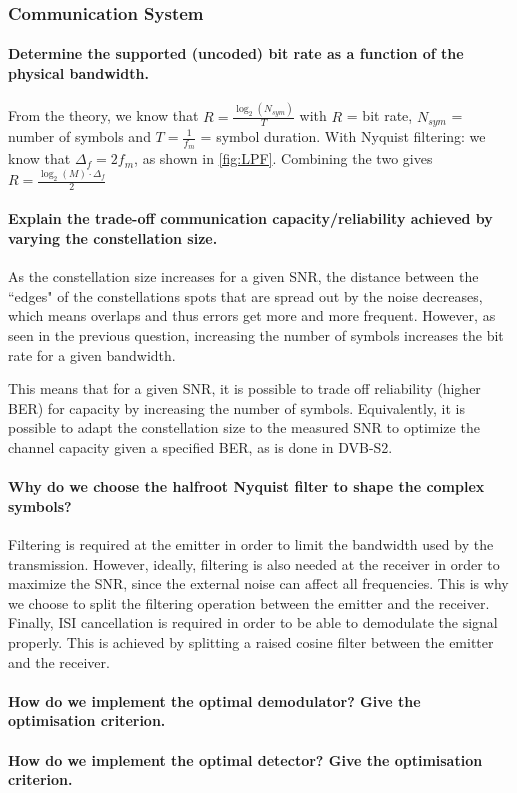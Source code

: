 \subsubsection{Communication System}
\paragraph{Determine the supported (uncoded) bit rate as a function of the physical bandwidth.} From the theory, we know that $R = \frac{\log_2(N_{sym})}{T}$ with $R$ = bit rate, $N_{sym}$ = number of symbols and $T = \frac{1}{f_m}$ = symbol duration.
With Nyquist filtering: we know that $\Delta_f = 2f_m$, as shown in \ref{fig:LPF}.
Combining the two gives $R = \frac{\log_2(M)\cdot\Delta_f}{2}$

\paragraph{Explain the trade-off communication capacity/reliability achieved by varying the constellation size.}
As the constellation size increases for a given SNR, the distance between the ``edges" of the constellations spots that are spread out by the noise decreases, which means overlaps and thus errors get more and more frequent.
However, as seen in the previous question, increasing the number of symbols increases the bit rate for a given bandwidth.

This means that for a given SNR, it is possible to trade off reliability (higher BER) for capacity by increasing the number of symbols. Equivalently, it is possible to adapt the constellation size to the measured SNR to optimize the channel capacity given a specified BER, as is done in DVB-S2.

\paragraph{Why do we choose the halfroot Nyquist filter to shape the complex symbols?}
Filtering is required at the emitter in order to limit the bandwidth used by the transmission.
However, ideally, filtering is also needed at the receiver in order to maximize the SNR, since the external noise can affect all frequencies.
This is why we choose to split the filtering operation between the emitter and the receiver.
Finally, ISI cancellation is required in order to be able to demodulate the signal properly.
This is achieved by splitting a raised cosine filter between the emitter and the receiver.

\paragraph{How do we implement the optimal demodulator? Give the optimisation criterion.}


\paragraph{How do we implement the optimal detector? Give the optimisation criterion.}
